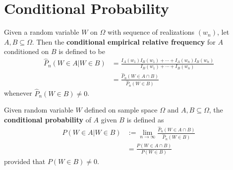 \documentclass{article}
\begin{document}
   	\section{Conditional Probability}
   	\begin{definition}
   		Given a random variable $W$ on $\Omega$ with sequence of realizations $(w_n)$, let $A, B \subseteq \Omega$. Then the \textbf{conditional empirical relative frequency} for $A$ conditioned on $B$ is defined to be
   		\begin{align}
   			\hat{P}_{n}(W \in A | W \in B) &=\frac{I_{A}\left(w_{1}\right) I_{B}\left(w_{1}\right)+\cdots+I_{A}\left(w_{n}\right) I_{B}\left(w_{n}\right)}{I_{B}\left(w_{1}\right)+\cdots+I_{B}\left(w_{n}\right)} \\
   			&= \frac{\hat{P}_n(W \in A \cap B)}{\hat{P}_n(W \in B)}
   		\end{align}
   		whenever $\hat{P}_n(W \in B) \neq 0$.
   	\end{definition}
   	
   	\begin{definition}
   		Given random variable $W$ defined on sample space $\Omega$ and $A, B \subseteq \Omega$, the \textbf{conditional probability} of $A$ given $B$ is defined as
   		\begin{align}
   			P(W \in A | W \in B) &:= \lim_{n \to \infty} \frac{\hat{P}_n(W \in A \cap B)}{\hat{P}_n(W \in B)} \\
   			&= \frac{P(W \in A \cap B)}{P(W \in B)}
   		\end{align}
   		provided that $P(W \in B) \neq 0$.
   	\end{definition}
\end{document}
